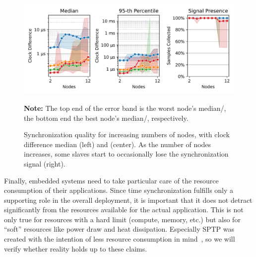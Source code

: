 \begin{figure}
\begin{center}
\includegraphics[width=\linewidth]{res/generated/resource_consumption/summary_quality_trend.pdf}
\legend
\end{center}

{\footnotesize {\bfseries Note:} The top end of the error band is the worst node's median/\PNineFive{}, the bottom end the best node's median/\PNineFive{}, respectively.}
\caption{Synchronization quality for increasing numbers of nodes, with clock difference median (left) and \PNineFive{} (center). As the number of nodes increases, some slaves start to occasionally lose the synchronization signal (right).}
\label{fig:resource_consumption_quality}
\end{figure}


Finally, embedded systems need to take particular care of the resource consumption of their applications. Since time synchronization fulfills only a supporting role in the overall deployment, it is important that it does not detract significantly from the resources available for the actual application. This is not only true for resources with a hard limit (compute, memory, etc.) but also for ``soft'' resources like power draw and heat dissipation. Especially SPTP was created with the intention of less resource consumption in mind~\cite{sptp}, so we will verify whether reality holds up to these claims.

